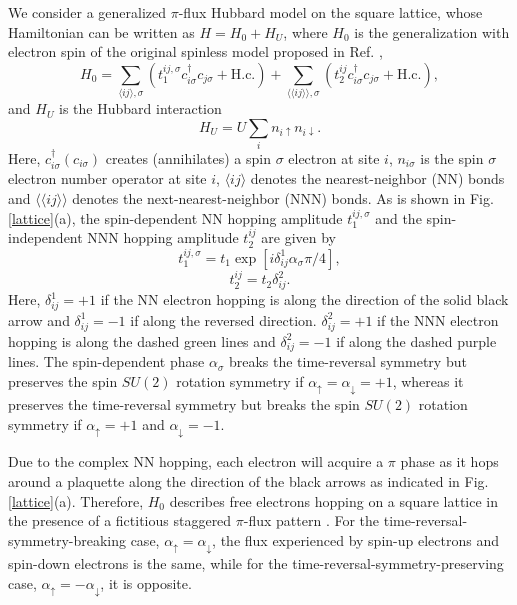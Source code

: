\documentclass[amsmath,superscriptaddress,showpacs,aps,prb,twocolumn]{revtex4-1}
\begin{document}
\par We consider a generalized $\pi$-flux Hubbard model on the square lattice, whose Hamiltonian can be written as $H=H_0+H_U$, where $H_0$ is the generalization with electron spin of the original spinless model proposed in Ref. \cite{NSCM_PRL2011},
\begin{equation}
H_0=\sum_{\langle ij\rangle,\sigma}(t_1^{ij,\sigma}c_{i\sigma}^\dagger c_{j\sigma}+\text{H.c.})
    +\sum_{\langle\langle ij\rangle\rangle,\sigma}(t_2^{ij}c_{i\sigma}^\dagger c_{j\sigma}+\text{H.c.}),
\end{equation}
and $H_U$ is the Hubbard interaction
\begin{equation}
H_U=U\sum_{i}n_{i\uparrow}n_{i\downarrow}.
\end{equation}
Here, $c_{i\sigma}^{\dagger}(c_{i\sigma})$ creates (annihilates) a spin $\sigma$ electron at site $i$, $n_{i\sigma}$ is the spin $\sigma$ electron number operator at site $i$, $\langle ij\rangle$ denotes the nearest-neighbor (NN) bonds and $\langle\langle ij\rangle\rangle$ denotes the next-nearest-neighbor (NNN) bonds. As is shown in Fig. \ref{lattice}(a), the spin-dependent NN hopping amplitude $t_1^{ij,\sigma}$ and the spin-independent NNN hopping amplitude $t_2^{ij}$ are given by
\begin{equation}
t_1^{ij,\sigma}=t_1\exp\left[i\delta^1_{ij}\alpha_\sigma\pi/4\right],
\end{equation}
\begin{equation}
t_2^{ij}=t_2\delta^2_{ij}.
\end{equation}
Here, $\delta^1_{ij}=+1$ if the NN electron hopping is along the direction of the solid black arrow and $\delta^1_{ij}=-1$ if along the reversed direction. $\delta^2_{ij}=+1$ if the NNN electron hopping is along the dashed green lines and $\delta^2_{ij}=-1$ if along the dashed purple lines. The spin-dependent phase $\alpha_\sigma$ breaks the time-reversal symmetry but preserves the spin $SU(2)$ rotation symmetry if $\alpha_\uparrow=\alpha_\downarrow=+1$, whereas it preserves the time-reversal symmetry but breaks the spin $SU(2)$ rotation symmetry if $\alpha_\uparrow=+1$ and $\alpha_\downarrow=-1$.

\par Due to the complex NN hopping, each electron will acquire a $\pi$ phase as it hops around a plaquette along the direction of the black arrows as indicated in Fig. \ref{lattice}(a). Therefore, $H_0$ describes free electrons hopping on a square lattice in the presence of a fictitious staggered $\pi$-flux pattern \cite{WWZ_PRB1989}. For the time-reversal-symmetry-breaking case, $\alpha_\uparrow=\alpha_\downarrow$, the flux experienced by spin-up electrons and spin-down electrons is the same, while for the time-reversal-symmetry-preserving case, $\alpha_\uparrow=-\alpha_\downarrow$, it is opposite.
\end{document}
